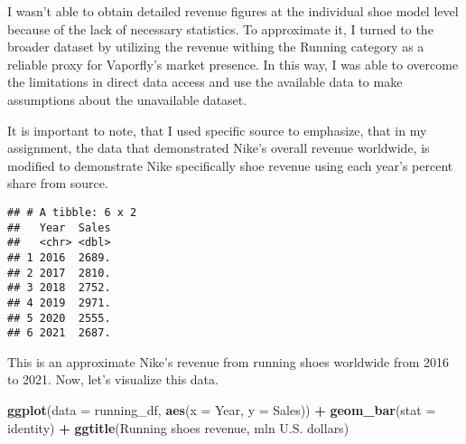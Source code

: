 \documentclass[
]{article}
\newenvironment{Shaded}{\begin{snugshade}}{\end{snugshade}}
\newcommand{\AttributeTok}[1]{\textcolor[rgb]{0.13,0.29,0.53}{#1}}
\newcommand{\DecValTok}[1]{\textcolor[rgb]{0.00,0.00,0.81}{#1}}
\newcommand{\FloatTok}[1]{\textcolor[rgb]{0.00,0.00,0.81}{#1}}
\newcommand{\FunctionTok}[1]{\textcolor[rgb]{0.13,0.29,0.53}{\textbf{#1}}}
\newcommand{\NormalTok}[1]{#1}
\newcommand{\OtherTok}[1]{\textcolor[rgb]{0.56,0.35,0.01}{#1}}
\newcommand{\SpecialCharTok}[1]{\textcolor[rgb]{0.81,0.36,0.00}{\textbf{#1}}}
\newcommand{\StringTok}[1]{\textcolor[rgb]{0.31,0.60,0.02}{#1}}
\begin{document}
I wasn't able to obtain detailed revenue figures at the individual shoe
model level because of the lack of necessary statistics. To approximate
it, I turned to the broader dataset by utilizing the revenue withing the
Running category as a reliable proxy for Vaporfly's market presence. In
this way, I was able to overcome the limitations in direct data access
and use the available data to make assumptions about the unavailable
dataset.

It is important to note, that I used specific source to emphasize, that
in my assignment, the data that demonstrated Nike's overall revenue
worldwide, is modified to demonstrate Nike specifically shoe revenue
using each year's percent share from source.

\begin{Shaded}
\end{Shaded}

\begin{verbatim}
## # A tibble: 6 x 2
##   Year  Sales
##   <chr> <dbl>
## 1 2016  2689.
## 2 2017  2810.
## 3 2018  2752.
## 4 2019  2971.
## 5 2020  2555.
## 6 2021  2687.
\end{verbatim}

This is an approximate Nike's revenue from running shoes worldwide from
2016 to 2021. Now, let's visualize this data.

\begin{Shaded}
\begin{Highlighting}[]
\FunctionTok{ggplot}\NormalTok{(}\AttributeTok{data =}\NormalTok{ running\_df, }\FunctionTok{aes}\NormalTok{(}\AttributeTok{x =}\NormalTok{ Year, }\AttributeTok{y =}\NormalTok{ Sales)) }\SpecialCharTok{+}
\FunctionTok{geom\_bar}\NormalTok{(}\AttributeTok{stat =} \StringTok{\textquotesingle{}identity\textquotesingle{}}\NormalTok{) }\SpecialCharTok{+}
\FunctionTok{ggtitle}\NormalTok{(}\StringTok{\textquotesingle{}Running shoes revenue, mln U.S. dollars\textquotesingle{}}\NormalTok{)}
\end{Highlighting}
\end{Shaded}
\end{document}
